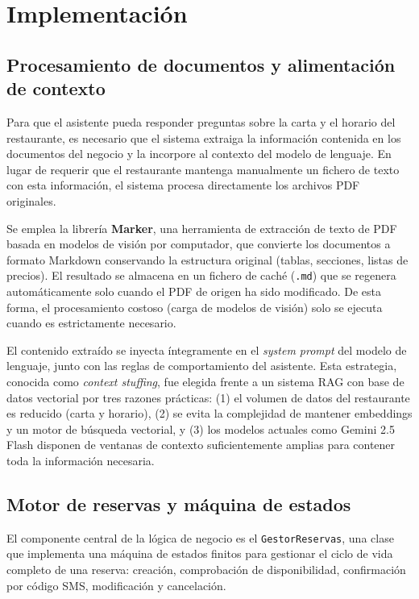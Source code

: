 \chapter{\textbf{Implementación}}
\label{ch:Implementacion}
\thispagestyle{fancy}

\section{Procesamiento de documentos y alimentación de contexto}
\label{sec:procesamiento_documentos}

Para que el asistente pueda responder preguntas sobre la carta y el horario del restaurante, es necesario que el sistema extraiga la información contenida en los documentos del negocio y la incorpore al contexto del modelo de lenguaje. En lugar de requerir que el restaurante mantenga manualmente un fichero de texto con esta información, el sistema procesa directamente los archivos PDF originales.

Se emplea la librería \textbf{Marker}, una herramienta de extracción de texto de PDF basada en modelos de visión por computador, que convierte los documentos a formato Markdown conservando la estructura original (tablas, secciones, listas de precios). El resultado se almacena en un fichero de caché (\texttt{.md}) que se regenera automáticamente solo cuando el PDF de origen ha sido modificado. De esta forma, el procesamiento costoso (carga de modelos de visión) solo se ejecuta cuando es estrictamente necesario.

El contenido extraído se inyecta íntegramente en el \textit{system prompt} del modelo de lenguaje, junto con las reglas de comportamiento del asistente. Esta estrategia, conocida como \textit{context stuffing}, fue elegida frente a un sistema RAG con base de datos vectorial por tres razones prácticas: (1) el volumen de datos del restaurante es reducido (carta y horario), (2) se evita la complejidad de mantener embeddings y un motor de búsqueda vectorial, y (3) los modelos actuales como Gemini 2.5 Flash disponen de ventanas de contexto suficientemente amplias para contener toda la información necesaria.

\section{Motor de reservas y máquina de estados}
\label{sec:motor_reservas}

El componente central de la lógica de negocio es el \texttt{GestorReservas}, una clase que implementa una máquina de estados finitos para gestionar el ciclo de vida completo de una reserva: creación, comprobación de disponibilidad, confirmación por código SMS, modificación y cancelación.

